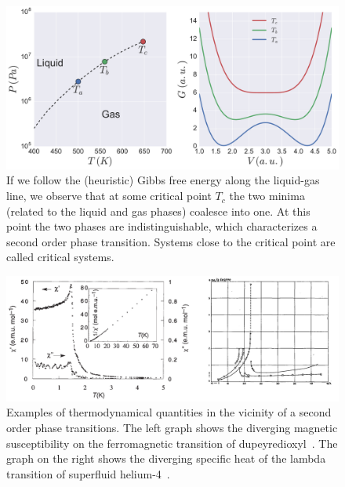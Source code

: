 \begin{figure}
\begin{center}
    \includegraphics[width=\textwidth]{chapters/ch2-crit/figs/gibbs2}
\end{center}
\caption{If we follow the (heuristic) Gibbs free energy along the liquid-gas
    line, we observe that at some critical point $T_c$ the two minima (related
    to the liquid and gas phases) coalesce into one. At this point the two
    phases are indistinguishable, which characterizes a second order phase
    transition. Systems close to the critical point are called critical
    systems.}
\label{fig:gibbs2}
\end{figure}


\begin{figure}
\begin{center}
    \includegraphics[width=\textwidth]{chapters/ch2-crit/figs/suscep}
\end{center}
\caption{Examples of thermodynamical quantities in the vicinity of a second
    order phase transitions. The left graph shows the diverging magnetic
    susceptibility on the ferromagnetic transition of
    dupeyredioxyl~\cite{Chiarelli1993}. The graph on the right shows the
    diverging specific heat of the lambda transition of superfluid
    helium-4~\cite{Keesom1935}.}
\label{fig:suscep}
\end{figure}

